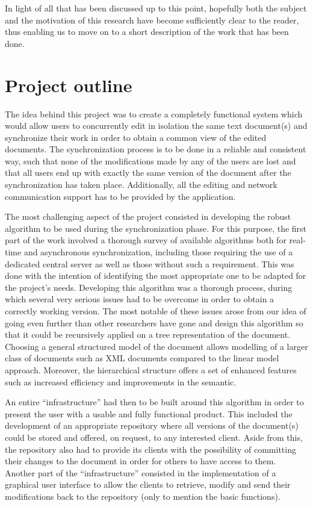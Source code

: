 In light of all that has been discussed up to this point, hopefully both the subject and the motivation
of this research have become sufficiently clear to the reader, thus enabling us to move on to a short
description of the work that has been done.

\section{Project outline}

The idea behind this project was to create a completely functional system which would allow users to
concurrently edit in isolation the same text document(s) and synchronize their work in order to obtain
a common view of the edited documents. The synchronization process is to be done in a reliable and
consistent way, such that none of the modifications made by any of the users are lost and that all
users end up with exactly the same version of the document after the synchronization has taken place.
Additionally, all the editing and network communication support has to be provided by the application.

The most challenging aspect of the project consisted in developing the robust algorithm to be
used during the synchronization phase. For this purpose, the first part of the work involved
a thorough survey of available algorithms both for real-time and asynchronous synchronization,
including those requiring the use of a dedicated central server as well as those without such
a requirement. This was done with the intention of identifying the most appropriate one to
be adapted for the project's needs. Developing this algorithm was a thorough process, during
which several very serious issues had to be overcome in order to obtain a correctly working
version. The most notable of these issues arose from our idea of going even further than other
researchers have gone and design this algorithm so that it could be recursively applied on a tree
representation of the document. Choosing a general structured model of the document allows
modelling of a larger class of documents such as XML documents compared to the linear model
approach. Moreover, the hierarchical structure offers a set of enhanced features such as
increased efficiency and improvements in the semantic.

An entire ``infrastructure'' had then to be built around this algorithm in order to present
the user with a usable and fully functional product. This included the development of an
appropriate repository where all versions of the document(s) could be stored and offered,
on request, to any interested client. Aside from this, the repository also had to provide
its clients with the possibility of committing their changes to the document in order for
others to have access to them. Another part of the ``infrastructure'' consisted in the
implementation of a graphical user interface to allow the clients to retrieve, modify
and send their modifications back to the repository (only to mention the basic functions).

